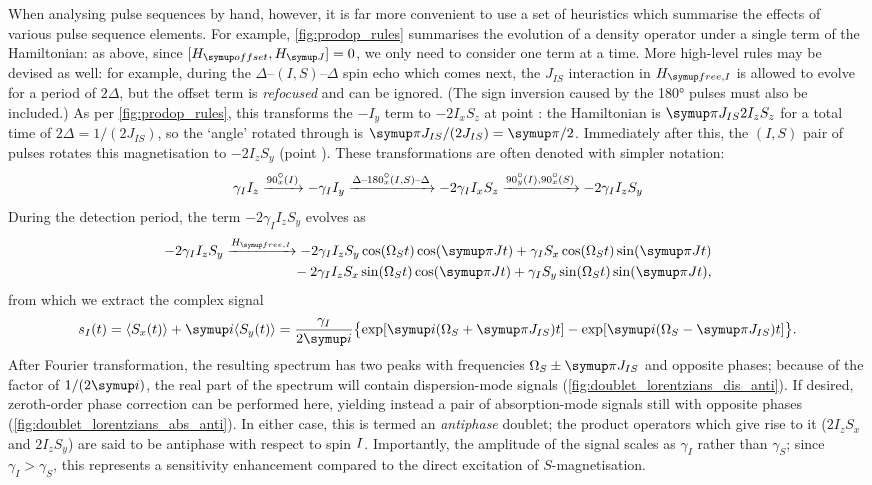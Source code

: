 When analysing pulse sequences by hand, however, it is far more convenient to use a set of heuristics which summarise the effects of various pulse sequence elements.
For example, \cref{fig:prodop_rules} summarises the evolution of a density operator under a single term of the Hamiltonian: as above, since $[\Hoffset, \HJ] = 0$, we only need to consider one term at a time.
More high-level rules may be devised as well: for example, during the $\Delta$--$(I,S)$--$\Delta$ spin echo which comes next, the $J_{IS}$ interaction in $\HfreeI$ is allowed to evolve for a period of $2\Delta$, but the offset term is \textit{refocused} and can be ignored.
(The sign inversion caused by the \ang{180} pulses must also be included.)
As per \cref{fig:prodop_rules}, this transforms the $-I_y$ term to $-2I_xS_z$ at point : the Hamiltonian is $\cpi J_{IS} 2I_zS_z$ for a total time of $2\Delta = 1/(2J_{IS})$, so the `angle' rotated through is $\cpi J_{IS}/(2J_{IS}) = \cpi/2$.
Immediately after this, the $(I,S)$ pair of pulses rotates this magnetisation to $-2I_zS_y$ (point ).
These transformations are often denoted with simpler notation:
\begin{equation}
    \label{eq:inept_prodop}
    \gamma_I I_z
    \xrightarrow{\angang{90}{x}(I)} -\gamma_I I_y
    \xrightarrow{\Delta\text{--}\angang{180}{x}(I,S)\text{--}\Delta} -2\gamma_I I_xS_z
    \xrightarrow{\angang{90}{y}(I),\angang{90}{x}(S)} -2\gamma_I I_zS_y
\end{equation}
During the detection period, the term $-2\gamma_II_zS_y$ evolves as
\begin{align}
    \label{eq:inept_fid_prodop}
    -2\gamma_I I_zS_y \xrightarrow{\HfreeI} -2\gamma_I I_zS_y\cos(\Omega_St)\cos(\cpi Jt) + \gamma_I S_x\cos(\Omega_St)\sin(\cpi Jt) \notag{} \\
    \qquad \qquad {} - 2\gamma_I I_zS_x\sin(\Omega_St)\cos(\cpi Jt) + \gamma_I S_y\sin(\Omega_S t)\sin(\cpi Jt),
\end{align}
from which we extract the complex signal
\begin{equation}
    \label{eq:inept_fid}
    s_I(t) = \langle S_x(t) \rangle + \mi \langle S_y(t) \rangle = \frac{\gamma_I}{2\mi}\bigl\{\exp[\mi(\Omega_S + \cpi J_{IS})t] - \exp[\mi(\Omega_S - \cpi J_{IS})t]\bigr\}.
\end{equation}
After Fourier transformation, the resulting spectrum has two peaks with frequencies $\Omega_S \pm \cpi J_{IS}$ and opposite phases; because of the factor of $1/(2\mi)$, the real part of the spectrum will contain dispersion-mode signals (\cref{fig:doublet_lorentzians_dis_anti}).
If desired, zeroth-order phase correction can be performed here, yielding instead a pair of absorption-mode signals still with opposite phases (\cref{fig:doublet_lorentzians_abs_anti}).
In either case, this is termed an \textit{antiphase} doublet; the product operators which give rise to it ($2I_zS_x$ and $2I_zS_y$) are said to be antiphase with respect to spin $I\/$.
Importantly, the amplitude of the signal scales as $\gamma_I$ rather than $\gamma_S$; since $\gamma_I > \gamma_S$, this represents a sensitivity enhancement compared to the direct excitation of $S$-magnetisation.

